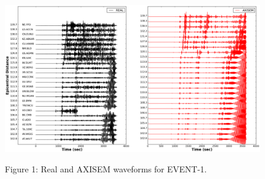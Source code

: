 \documentclass{article}
\begin{document}
\newpage
\begin{figure}[H]
\centering
\includegraphics[width=1.\linewidth]{AXISEMTutorial-fig007.png}
\begin{center}
{\small{}Figure 1: Real and AXISEM waveforms for EVENT-1.}
\end{center}
\end{figure}
\end{document}
